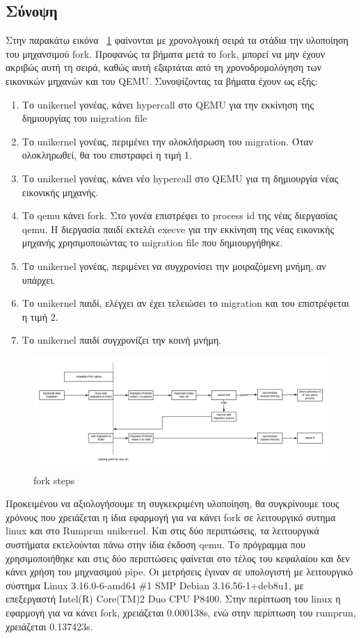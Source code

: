 \subsection{Σύνοψη}

Στην παρακάτω εικόνα ~\ref{fig4_11} φαίνονται με χρονολγοική σειρά τα στάδια
την υλοποίηση του μηχανσιμού fork. Προφανώς τα βήματα μετά το fork, μπορεί να
μην έχουν ακριβώς αυτή τη σειρά, καθώς αυτή εξαρτάται από τη χρονοδρομολόγηση
των εικονικών μηχανών και του QEMU. Συνοψίζοντας τα βήματα έχουν ως εξής:
\begin{enumerate}
	\item Το unikernel γονέας, κάνει hypercall στο QEMU για την εκκίνηση της
		δημιουργίας του migration file 
	\item Το unikernel γονέας, περιμένει την ολοκλήσρωση του migration. Όταν
		ολοκληρωθεί, θα του επιστραφεί η τιμή 1.
	\item Το unikernel γονέας, κάνει νέο hypercall στο QEMU για τη
		δημιουργία νέας εικονικής μηχανής. 
	\item Το qemu κάνει fork. Στο γονέα επιστρέφει το process id της νέας
		διεργασίας qemu. Η διεργασία παιδί εκτελέι execve για την
		εκκίνηση της νέας εικονικής μηχανής χρησιμοποιώντας το migration
		file που δημιουργήθηκε. 
	\item Το unikernel γονέας, περιμένει να συγχρονίσει την μοιραζόμενη
		μνήμη, αν υπάρχει.
	\item Το unikernel παιδί, ελέγχει αν έχει τελειώσει το migration και του
		επιστρέφεται η τιμή 2.
	\item Το unikernel παιδί συγχρονίζει την κοινή μνήμη.
\end{enumerate}

\begin{figure}[htp]
\centerline{\includegraphics[scale=0.6]{figures/fork_timeline.png}}
\caption{fork steps\label{fig4_11}}
\end{figure}

Προκειμένου να αξιολογήσουμε τη συγκεκριμένη υλοποίηση, θα συγκρίνουμε τους
χρόνους που χρειάζεται η ίδια εφαρμογή για να κάνει fork σε λειτουργικό συτημα
linux και στο Rumprun unikernel. Και στις δύο περιπτώσεις, τα λειτουργικά
συστήματα εκτελούνται πάνω στην ίδια έκδοση qemu. Το πρόγραμμα που
χρησιμοποιήθηκε και στις δύο περιπτώσεις φαίνεται στο τέλος του κεφαλαίου και
δεν κάνει χρήση του μηχνασιμού pipe. Οι μετρήσεις έγιναν σε υπολογιστή με
λειτουργικό σύστημα Linux 3.16.0-6-amd64 \#1 SMP Debian 3.16.56-1+deb8u1, με
επεξεργαστή Intel(R) Core(TM)2 Duo CPU P8400. Στην περίπτωση του linux η
εφαρμογή για να κάνει fork, χρειάζεται 0.000138s,  ενώ στην περίπτωση του
rumprun, χρειάζεται 0.137423s. 

